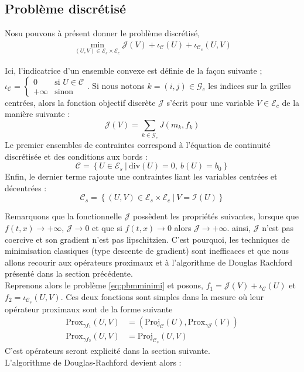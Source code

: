\documentclass[a4paper,12pt]{article}
\newcommand{\prox}{\text{Prox}}
\renewcommand{\div}{\text{div}}
\newcommand{\proj}{\text{Proj}}
\begin{document}
\subsection{Problème discrétisé}

Nosu pouvons à présent donner le problème discrétisé, 
\begin{align}
\min_{(U,V)\in\mathcal{E}_s\times\mathcal{E}_c} \mathcal{J}(V) + \iota_{\mathcal{C}}(U) + \iota_{\mathcal{C}_s}(U,V)
\end{align}

Ici, l'indicatrice d'un ensemble convexe est définie de la façon suivante ; $ \iota_{\mathcal{C}}=\left\{\begin{array}{cl}
0 &\text{si } U\in\mathcal{C} \\
+\infty &\text{sinon }
\end{array}\right.$. Si nous notons $k=(i,j)\in\mathcal{G}_c$ les indices sur la grilles centrées, alors la fonction objectif discrète $\mathcal{J}$ s'écrit pour une variable $V\in\mathcal{E}_c$  de la manière suivante : 
$$
\mathcal{J}(V)=\sum_{k\in\mathcal{G}_c} J(m_k,f_k)
$$
Le premier ensembles de contraintes correspond à l'équation de continuité discrétisée et des conditions aux bords : 
$$
\mathcal{C}= \left\{ U\in \mathcal{E}_s\ |\ \div(U)=0,\ b(U) = b_0 \right\}
$$
Enfin, le dernier terme rajoute une contraintes liant les variables centrées et décentrées : 
$$
\mathcal{C}_s=\left\{(U,V)\in\mathcal{E}_s\times\mathcal{E}_c\ |\ V=\mathcal{I}(U)\right\}
$$


Remarquons que la fonctionnelle $\mathcal{J}$ possèdent les propriétés suivantes, lorsque que $f(t,x)\rightarrow +\infty$, $\mathcal{J}\rightarrow 0$ et que si $f(t,x)\rightarrow 0$ alors $\mathcal{J}\rightarrow +\infty$. ainsi, $\mathcal{J}$ n'est pas coercive et son gradient n'est pas lipschitzien. C'est pourquoi, les techniques de minimisation classiques (type descente de gradient) sont inefficaces et que nous allons recourir aux opérateurs proximaux et à l'algorithme de Douglas Rachford présenté dans la section précédente.  \\


Reprenons alors le problème \eqref{eq:pbmminimi} et posons, $f_1 =\mathcal{J}(V) + \iota_{\mathcal{C}}(U) $ et $f_2= \iota_{\mathcal{C}_s}(U,V)$. Ces deux fonctions sont simples dans la mesure où leur opérateur proximaux sont de la forme suivante
\begin{align}
\prox_{\gamma f_1}(U,V) & = \left(\proj_{\mathcal{C}}(U),\prox_{\gamma \mathcal{J}}(V) \right) \\
\prox_{\gamma f_2}(U,V) & = \proj_{\mathcal{C}_s}(U,V)
\end{align}
C'est opérateurs seront explicité dans la section suivante. \\
L'algorithme de Douglas-Rachford devient alors :\\
\end{document}
